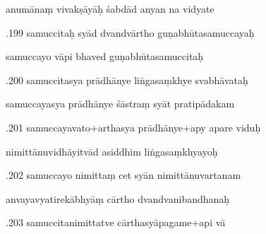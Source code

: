 \documentclass[article,12pt,a4paper]{memoir}%
\newcounter{parCount}
\begin{document}
	  
	  \pstart \leavevmode%
	anumānaṃ vivakṣāyāḥ śabdād anyan na vidyate 
	{}
	\pend%
      

	  
	  \pstart {}.199 samuccitaḥ syād dvandvārtho   guṇabhūtasamuccayaḥ 
	{}
	\pend%
      

	  
	  \pstart \leavevmode%
	samuccayo vāpi bhaved guṇabhūtasamuccitaḥ 
	{}
	\pend%
      

	  
	  \pstart {}.200 samuccitasya prādhānye liṅgasaṃkhye svabhāvataḥ 
	{}
	\pend%
      

	  
	  \pstart \leavevmode%
	samuccayasya prādhānye śāstraṃ syāt pratipādakam 
	{}
	\pend%
      

	  
	  \pstart {}.201 samuccayavato+arthasya prādhānye+apy apare viduḥ 
	{}
	\pend%
      

	  
	  \pstart \leavevmode%
	nimittānuvidhāyitvād asiddhim liṅgasaṃkhyayoḥ 
	{}
	\pend%
      

	  
	  \pstart {}.202 samuccayo nimittaṃ cet syān nimittānuvartanam 
	{}
	\pend%
      

	  
	  \pstart \leavevmode%
	anvayavyatirekābhyāṃ cārtho dvandvanibandhanaḥ 
	{}
	\pend%
      

	  
	  \pstart {}.203 samuccitanimittatve cārthasyāpagame+api vā 
	{}
	\pend%
      
\end{document}
